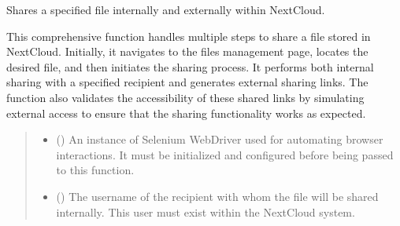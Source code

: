 \documentclass[letterpaper,10pt,english]{sphinxmanual}
\begin{document}

\begin{fulllineitems}
\label{\detokenize{tests:tests.test_file_share.share_file}}
\pysigstartsignatures
{}
\pysigstopsignatures
\sphinxAtStartPar
Shares a specified file internally and externally within NextCloud.

\sphinxAtStartPar
This comprehensive function handles multiple steps to share a file stored in NextCloud. Initially, it navigates
to the files management page, locates the desired file, and then initiates the sharing process. It performs both
internal sharing with a specified recipient and generates external sharing links. The function also validates 
the accessibility of these shared links by simulating external access to ensure that the sharing functionality 
works as expected.
\begin{quote}\begin{description}
\begin{itemize}
\item {} 
\sphinxAtStartPar
{} () \textendash{} An instance of Selenium WebDriver used for automating browser interactions. It must be
initialized and configured before being passed to this function.

\item {} 
\sphinxAtStartPar
{} () \textendash{} The username of the recipient with whom the file will be shared internally. This user must
exist within the NextCloud system.


\end{itemize}
\end{description}
\end{quote}
\end{fulllineitems}
\end{document}
